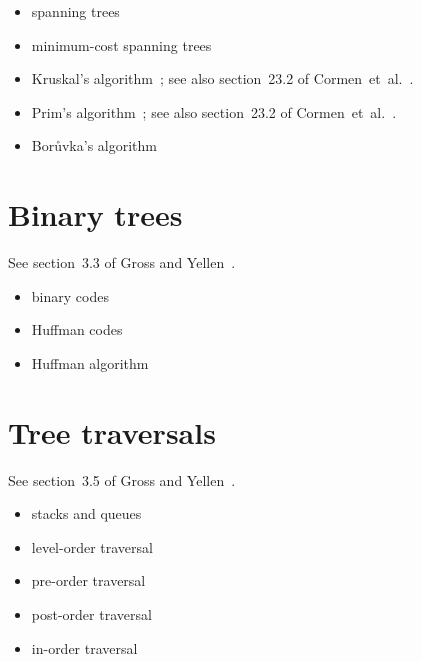 \begin{itemize}
\item spanning trees

\item minimum-cost spanning trees

\item Kruskal's algorithm~\cite{Kruskal1956}; see also section~23.2 of
  Cormen~et~al.~\cite{CormenEtAl2001}.

\item Prim's algorithm~\cite{Prim1957}; see also section~23.2 of
  Cormen~et~al.~\cite{CormenEtAl2001}.

\item Bor\r{u}vka's algorithm~\cite{Boruvka1926a,Boruvka1926b}
\end{itemize}



\section{Binary trees}

See section~3.3 of Gross and Yellen~\cite{GrossYellen1999}.

\begin{itemize}
\item binary codes

\item Huffman codes

\item Huffman algorithm
\end{itemize}



\section{Tree traversals}

See section~3.5 of Gross and Yellen~\cite{GrossYellen1999}.

\begin{itemize}
\item stacks and queues

\item level-order traversal

\item pre-order traversal

\item post-order traversal

\item in-order traversal
\end{itemize}


